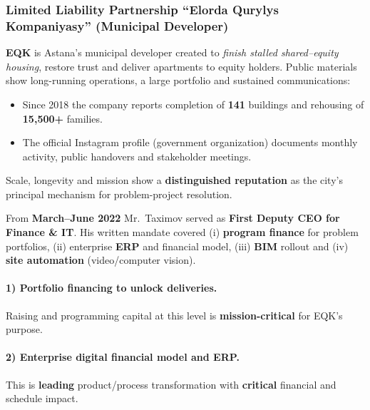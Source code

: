 \subsubsection{Limited Liability Partnership “Elorda Qurylys Kompaniyasy” (Municipal Developer)}
\label{subsubsec:RoleEQK}

\textbf{EQK} is Astana’s municipal developer created to \emph{finish stalled shared–equity housing}, restore trust and deliver apartments to equity holders. Public materials show long-running operations, a large portfolio and sustained communications:
\vspace{-0.5\baselineskip}
\begin{itemize}[nosep]
  \item Since 2018 the company reports completion of \textbf{141} buildings and rehousing of \textbf{15{,}500+} families. 
  \item The official Instagram profile (government organization) documents monthly activity, public handovers and stakeholder meetings. 
\end{itemize}
Scale, longevity and mission show a \textbf{distinguished reputation} as the city’s principal mechanism for problem-project resolution.

From \textbf{March–June 2022} Mr.\ Taximov served as \textbf{First Deputy CEO for Finance \& IT}. His written mandate covered (i) \textbf{program finance} for problem portfolios, (ii) enterprise \textbf{ERP} and financial model, (iii) \textbf{BIM} rollout and (iv) \textbf{site automation} (video/computer vision). 

\paragraph{1) Portfolio financing to unlock deliveries.}
Raising and programming capital at this level is \textbf{mission-critical} for EQK’s purpose.

\paragraph{2) Enterprise digital financial model and ERP.}
This is \textbf{leading} product/process transformation with \textbf{critical} financial and schedule impact.

